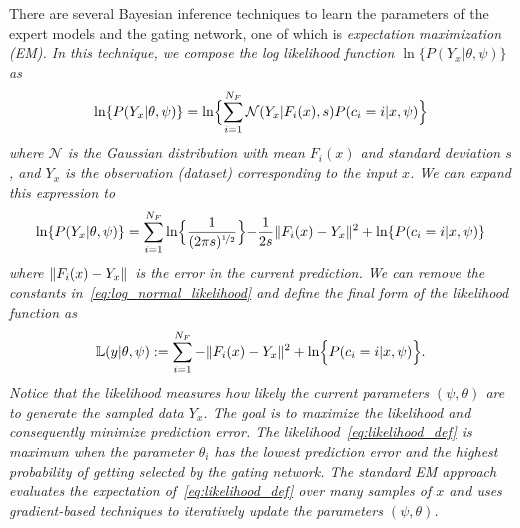 There are several Bayesian inference techniques to learn the parameters of the
expert models and the gating network, one of which is \it{expectation
maximization} \normalfont (EM).
%
In this technique, we compose the log likelihood function $\ln \{P(Y_x | \theta,
\psi) \}$ as~\cite{bishop2006pattern}   
\begin{equation}
  \ln \{P(Y_x | \theta, \psi) \} = \ln \Bigl\{ \sum_{i=1}^{N_F} \mathcal{N}(Y_x | F_i(x), s) P(c_i = i | x, \psi) \Bigr\}
  \label{eq:likelihood}
\end{equation}
\noindent where $\mathcal{N}$ is the Gaussian distribution with mean $F_i(x)$
and standard deviation $s$, and $Y_x$ is the observation (dataset) corresponding
to the input $x$. We can expand this expression to 
\begin{align}
  \ln \{P(Y_x | \theta, \psi) \} = \sum_{i=1}^{N_F} \ln \Bigr\{ \frac{1}{(2 \pi s)^{\nicefrac{1}{2}}} \Bigl\} - \frac{1}{2s}\|{F_i(x) - Y_x}\|_{{}_{}}^2 + \ln \{P(c_i=i | x, \psi) \}
  \label{eq:log_normal_likelihood}
\end{align}
\noindent where $\|{F_i(x) - Y_x}\|_{{}_{}}$ is the error in the current prediction.
%
We can remove the constants in~\eqref{eq:log_normal_likelihood} and define the
final form of the likelihood function as
\begin{align}
  \mathbb{L}(y | \theta, \psi) := \sum_{i=1}^{N_F} - \|{F_i(x) - Y_x}\|_{{}_{}}^2 + \ln \Bigl\{ P(c_i=i | x, \psi) \Bigr\}.
  \label{eq:likelihood_def}
\end{align}
Notice that the likelihood measures how likely the current parameters $(\psi,
\theta)$ are to generate the sampled data $Y_x$. 
%
The goal is to maximize the likelihood and consequently minimize prediction
error.
%
The likelihood~\eqref{eq:likelihood_def} is maximum when the parameter $\theta_i$
has the lowest prediction error and the highest probability of getting selected
by the gating network.
%
The standard EM approach evaluates the expectation of~\eqref{eq:likelihood_def}
over many samples of $x$ and uses gradient-based techniques to iteratively
update the parameters $(\psi, \theta)$.
%